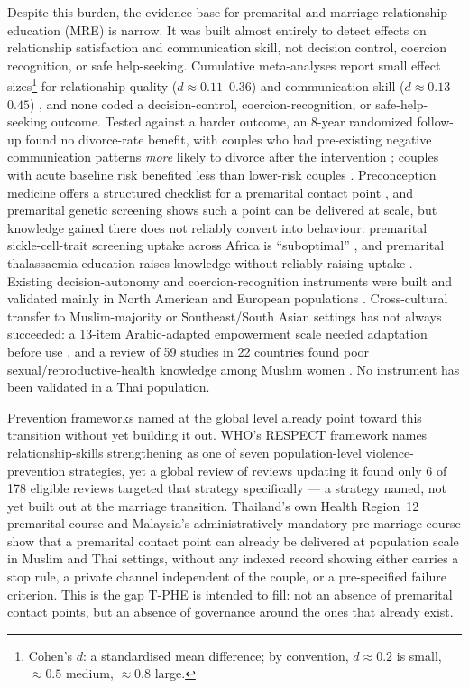 \documentclass[11pt]{article}
\newcommand{\tphe}{T\mbox{-}PHE}
\begin{document}
Despite this burden, the evidence base for premarital and marriage-relationship education (MRE) is narrow. It was built almost entirely to detect effects on relationship satisfaction and communication skill, not decision control, coercion recognition, or safe help-seeking. Cumulative meta-analyses report small effect sizes\footnote{Cohen's $d$: a standardised mean difference; by convention, $d\approx0.2$ is small, $\approx0.5$ medium, $\approx0.8$ large.} for relationship quality ($d\approx0.11$--$0.36$) and communication skill ($d\approx0.13$--$0.45$) \cite{ref6,ref7,ref8}, and none coded a decision-control, coercion-recognition, or safe-help-seeking outcome. Tested against a harder outcome, an 8-year randomized follow-up found no divorce-rate benefit, with couples who had pre-existing negative communication patterns \emph{more} likely to divorce after the intervention \cite{ref9}; couples with acute baseline risk benefited less than lower-risk couples \cite{ref10}. Preconception medicine offers a structured checklist for a premarital contact point \cite{ref11}, and premarital genetic screening shows such a point can be delivered at scale, but knowledge gained there does not reliably convert into behaviour: premarital sickle-cell-trait screening uptake across Africa is ``suboptimal'' \cite{ref12}, and premarital thalassaemia education raises knowledge without reliably raising uptake \cite{ref13}. Existing decision-autonomy and coercion-recognition instruments were built and validated mainly in North American and European populations \cite{ref16,ref17,ref18}. Cross-cultural transfer to Muslim-majority or Southeast/South Asian settings has not always succeeded: a 13-item Arabic-adapted empowerment scale needed adaptation before use \cite{ref19}, and a review of 59 studies in 22 countries found poor sexual/reproductive-health knowledge among Muslim women \cite{ref20}. No instrument has been validated in a Thai population.

Prevention frameworks named at the global level already point toward this transition without yet building it out. WHO's RESPECT framework names relationship-skills strengthening as one of seven population-level violence-prevention strategies, yet a global review of reviews updating it found only 6 of 178 eligible reviews targeted that strategy specifically \cite{who_respect,ref30} --- a strategy named, not yet built out at the marriage transition. Thailand's own Health Region~12 premarital course and Malaysia's administratively mandatory pre-marriage course show that a premarital contact point can already be delivered at population scale in Muslim and Thai settings, without any indexed record showing either carries a stop rule, a private channel independent of the couple, or a pre-specified failure criterion. This is the gap \tphe{} is intended to fill: not an absence of premarital contact points, but an absence of governance around the ones that already exist.
\end{document}

